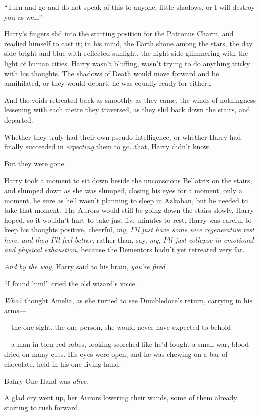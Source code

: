 “Turn and go and do not speak of this to anyone, little shadows, or I will destroy you as well.”

Harry’s fingers slid into the starting position for the Patronus Charm, and readied himself to cast it; in his mind, the Earth shone among the stars, the day side bright and blue with reflected sunlight, the night side glimmering with the light of human cities. Harry wasn’t bluffing, wasn’t trying to do anything tricky with his thoughts. The shadows of Death would move forward and be annihilated, or they would depart, he was equally ready for either…

And the voids retreated back as smoothly as they came, the winds of nothingness lessening with each metre they traversed, as they slid back down the stairs, and departed.

Whether they truly had their own pseudo-intelligence, or whether Harry had finally succeeded in \emph{expecting} them to go…that, Harry didn’t know.

But they were gone.

Harry took a moment to sit down beside the unconscious Bellatrix on the stairs, and slumped down as she was slumped, closing his eyes for a moment, only a moment, he sure as hell wasn’t planning to sleep in Azkaban, but he needed to take that moment. The Aurors would still be going down the stairs slowly, Harry hoped, so it wouldn’t hurt to take just five minutes to rest. Harry was careful to keep his thoughts positive, cheerful, \emph{my, I’ll just have some nice regenerative rest here, and then I’ll feel better,} rather than, say, \emph{my, I’ll just collapse in emotional and physical exhaustion,} because the Dementors hadn’t yet retreated very far.

\emph{And by the way,} Harry said to his brain, \emph{you’re fired}.

\later

“I found him!” cried the old wizard’s voice.

\emph{Who?} thought Amelia, as she turned to see Dumbledore’s return, carrying in his arms—

—the one sight, the one person, she would never have expected to behold—

—a man in torn red robes, looking scorched like he’d fought a small war, blood dried on many cuts. His eyes were open, and he was chewing on a bar of chocolate, held in his one living hand.

Bahry One-Hand was \emph{alive}.

A glad cry went up, her Aurors lowering their wands, some of them already starting to rush forward.

